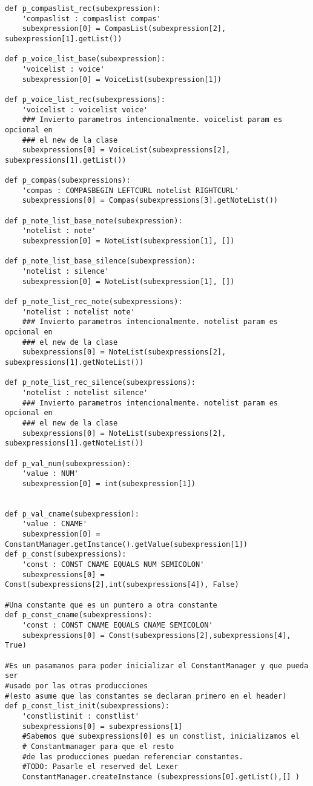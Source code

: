 \begin{verbatim}
def p_compaslist_rec(subexpression):
    'compaslist : compaslist compas'
    subexpression[0] = CompasList(subexpression[2], subexpression[1].getList())

def p_voice_list_base(subexpression):
    'voicelist : voice'
    subexpression[0] = VoiceList(subexpression[1])

def p_voice_list_rec(subexpressions):
    'voicelist : voicelist voice'
    ### Invierto parametros intencionalmente. voicelist param es opcional en 
    ### el new de la clase
    subexpressions[0] = VoiceList(subexpressions[2], subexpressions[1].getList())

def p_compas(subexpressions):
    'compas : COMPASBEGIN LEFTCURL notelist RIGHTCURL'
    subexpressions[0] = Compas(subexpressions[3].getNoteList())

def p_note_list_base_note(subexpression):
    'notelist : note'
    subexpression[0] = NoteList(subexpression[1], [])

def p_note_list_base_silence(subexpression):
    'notelist : silence'
    subexpression[0] = NoteList(subexpression[1], [])

def p_note_list_rec_note(subexpressions):
    'notelist : notelist note'
    ### Invierto parametros intencionalmente. notelist param es opcional en 
    ### el new de la clase
    subexpressions[0] = NoteList(subexpressions[2], subexpressions[1].getNoteList())

def p_note_list_rec_silence(subexpressions):
    'notelist : notelist silence'
    ### Invierto parametros intencionalmente. notelist param es opcional en 
    ### el new de la clase
    subexpressions[0] = NoteList(subexpressions[2], subexpressions[1].getNoteList())

def p_val_num(subexpression):
    'value : NUM'
    subexpression[0] = int(subexpression[1])


def p_val_cname(subexpression):
    'value : CNAME'
    subexpression[0] = ConstantManager.getInstance().getValue(subexpression[1])
def p_const(subexpressions):
    'const : CONST CNAME EQUALS NUM SEMICOLON'
    subexpressions[0] = Const(subexpressions[2],int(subexpressions[4]), False)

#Una constante que es un puntero a otra constante
def p_const_cname(subexpressions):
    'const : CONST CNAME EQUALS CNAME SEMICOLON'
    subexpressions[0] = Const(subexpressions[2],subexpressions[4], True)

#Es un pasamanos para poder inicializar el ConstantManager y que pueda ser 
#usado por las otras producciones
#(esto asume que las constantes se declaran primero en el header)
def p_const_list_init(subexpressions):
    'constlistinit : constlist'
    subexpressions[0] = subexpressions[1]
    #Sabemos que subexpressions[0] es un constlist, inicializamos el
    # Constantmanager para que el resto
    #de las producciones puedan referenciar constantes.
    #TODO: Pasarle el reserved del Lexer
    ConstantManager.createInstance (subexpressions[0].getList(),[] )



\end{verbatim}
